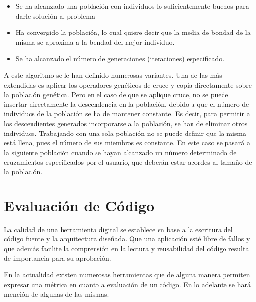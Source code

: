 \documentclass[a4paper,12pt]{book}
\begin{document}
		\begin{itemize}
			\item Se ha alcanzado una población con individuos lo suficientemente buenos para darle solución al problema.
			\item Ha convergido la población, lo cual quiere decir que la  media  de  bondad  de  la  misma  se aproxima a la bondad del mejor individuo.
			\item Se ha alcanzado el número de generaciones (iteraciones) especificado.
		\end{itemize}
	
		A este algoritmo se le han definido numerosas variantes. Una de las más extendidas es aplicar los operadores genéticos de cruce y copia directamente sobre la población genética. Pero en el caso de que se aplique cruce, no se puede insertar directamente la descendencia en la población, debido a que el número de individuos de la población se ha de mantener constante. Es decir, para permitir a los descendientes generados incorporarse a la población, se  han  de  eliminar  otros individuos. Trabajando con una sola población no se puede definir que la misma está llena, pues el número de sus miembros es constante. En este caso se pasará a la siguiente población cuando se hayan alcanzado un número determinado de cruzamientos especificados por el usuario, que deberán estar acordes al tamaño de la población.
		
		
\chapter{Evaluación de Código}

	La calidad de una herramienta digital se establece en base a la escritura del código fuente y la arquitectura diseñada. Que una aplicación esté libre de fallos y que además facilite la comprensión en la lectura y reusabilidad del código resulta de importancia para su aprobación.

	En la actualidad existen numerosas herramientas que de alguna manera permiten expresar una métrica en cuanto a evaluación de un código. En lo adelante se hará mención de algunas de las mismas.
	
\end{document}
